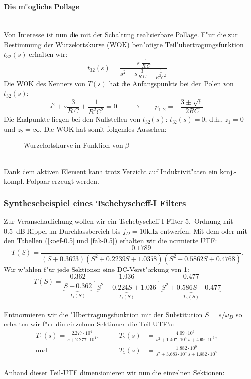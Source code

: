 \paragraph{Die m"ogliche Pollage}~\\
Von Interesse ist nun die mit der Schaltung realisierbare Pollage.
F"ur die zur Bestimmung der Wurzelortskurve
(WOK) ben"otigte Teil"ubertragungsfunktion $t_{32}(s)$ erhalten wir:
\[
t_{32}(s)=\frac{s ~\displaystyle\frac{1}{R~C}}{s^2 
+ s \displaystyle\frac{3}{R~C} + \displaystyle\frac{1}{R^2C^2}} 
\]
\nit Die WOK des Nenners von $T(s)$ hat die Anfangspunkte bei den Polen von 
$t_{32}(s)$:
\begin{equation*}
 s^2 + s \frac{3}{R~C} + \frac{1}{R^2C^2}=0 \qquad\rightarrow\qquad  p_{1,2}=-\frac{3\pm\sqrt{5}}{2RC}.
\end{equation*}
Die Endpunkte liegen bei den Nullstellen von $t_{32}(s)$: $t_{32}(s)=
0$; d.h., $z_1=0$ und $z_2=\infty$.  Die WOK hat somit folgendes
Aussehen:
\begin{figure}[!htb]
\begin{center}
  \caption{Wurzelortskurve in Funktion von $\beta $}
\end{center}
\vspace*{-6mm}
\end{figure}\\
\nit Dank dem aktiven Element kann trotz Verzicht auf Induktivit"aten
ein konj.-kompl. Polpaar erzeugt werden. 
\subsubsection{Synthesebeispiel eines Tschebyscheff-I Filters}
Zur Veranschaulichung wollen
wir ein Tschebyscheff-I Filter 5.~Ordnung mit 0.5~dB Rippel im Durchlassbereich bis
$f_D=10\mbox{kHz}$ entwerfen. Mit dem \mb{} oder mit
den Tabellen (\ref{koef-0.5} und \ref{fak-0.5}) erhalten wir die
normierte UTF:
\[
T(S)=\frac{0.1789}{(S+0.3623)(S^2+0.2239S+1.0358)(S^2+0.5862S+0.4768)}. 
\]
Wir w"ahlen f"ur jede Sektionen eine DC-Verst"arkung von 1:
\[
T(S)=\underbrace{\frac{0.362}{S + 0.362}}_{\displaystyle T_1(S)} \cdot 
\underbrace{\frac{1.036}{S^2 + 0.224 S + 1.036}}_{\displaystyle T_2(S)} \cdot 
\underbrace{\frac{0.477}{S^2 + 0.586 S + 0.477}}_{\displaystyle T_3(S)} 
\]\\
\nit Entnormieren wir die "Ubertragungsfunktion mit der Substitution
$S=s/\omega_D$ so erhalten wir f"ur die einzelnen Sektionen die
Teil-UTF's:
\begin{eqnarray*}
T_1(s)=\frac{2.277 \cdot 10^4}{s+2.277 \cdot 10^4},\qquad &T_2(s)&=\frac{4.09 \cdot 10^9}{s^2 + 1.407 \cdot 10^4 ~s+4.09 \cdot 10^9},\\
\text{und}\qquad &T_3(s)&=\frac{1.882 \cdot 10^9}{s^2 + 3.683 \cdot 10^4 ~s+ 1.882 \cdot 10^9}. 
\end{eqnarray*}\\
\nit Anhand dieser Teil-UTF dimensionieren wir nun die einzelnen
Sektionen:\\
